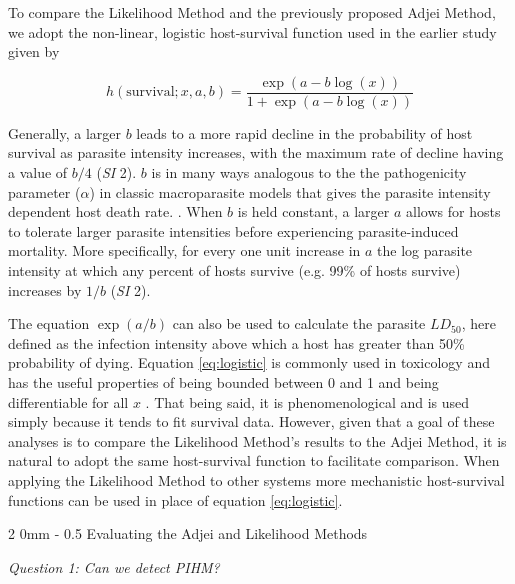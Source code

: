 \documentclass[12pt, a4paper]{article}
\makeatletter
\renewcommand{\subsection}{\@startsection
{subsection}%
{2}%
{0mm}%
{-\baselineskip}%
{0.5\baselineskip}%
{\normalfont\bf}} %
\makeatother
\begin{document}
To compare the Likelihood Method and the previously proposed Adjei Method, we adopt the non-linear, logistic host-survival function used in the earlier study given by

\begin{equation}
    h(\text{survival}; x, a, b) = \dfrac{\exp{(a - b \log(x))}}{1 + \exp{(a - b \log(x))}}
    \label{eq:logistic}
\end{equation}

Generally, a larger $b$ leads to a more rapid decline in the probability of host survival as parasite intensity increases, with the maximum rate of decline having a value of $b / 4$ (\emph{SI} 2). $b$ is in many ways analogous to the the pathogenicity parameter ($\alpha$) in classic macroparasite models that gives the parasite intensity dependent host death rate. \citep{AndersonandMay1978,Isham1995}. When $b$ is held constant, a larger $a$ allows for hosts to tolerate larger parasite intensities before experiencing parasite-induced mortality. More specifically, for every one unit increase in $a$ the log parasite intensity at which any percent of hosts survive (e.g. 99\% of hosts survive) increases by $ 1 / b$ (\emph{SI} 2).

The equation $\exp(a
/ b)$ can also be used to calculate the parasite $LD_{50}$, here defined as the
infection intensity above which a host has greater than 50\% probability of dying.  Equation \ref{eq:logistic} is commonly used in toxicology and has the useful properties of being bounded between 0 and 1 and being differentiable for all $x$ \citep{Collet2002}.  That being said, it is phenomenological and is used simply because it tends to fit survival data. However, given that a goal of these analyses is to
compare the Likelihood Method's results to the Adjei Method, it is natural
to adopt the same host-survival function to facilitate comparison.  When
applying the Likelihood Method to other systems more mechanistic host-survival functions can be used in place of equation \ref{eq:logistic}.

\subsection{Evaluating the Adjei and Likelihood Methods}

\emph{Question 1: Can we detect PIHM?}
\end{document}
